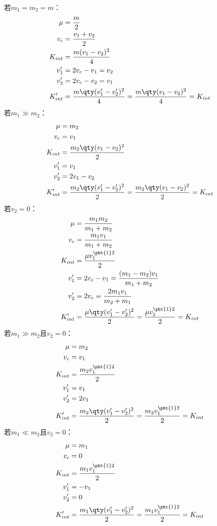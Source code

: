 \documentclass[a4paper,12pt]{article}
\begin{document}
若$m_1=m_2=m$：
\[\begin{aligned}
\mu&=\frac{m}{2}\\
v_c &= \frac{v_1+v_2}{2} \\
K_{int} &= \frac{m(v_1-v_2)^2}{4}\\
v_1' &= 2v_c - v_1 = v_2 \\
v_2' &= 2v_c - v_2 = v_1 \\
K_{int}' &= \frac{m\qty(v_1'-v_2')^2}{4} = \frac{m\qty(v_1-v_2)^2}{4} = K_{int}
\end{aligned}\]
若$m_1\gg m_2$：
\[\begin{aligned}
\mu&=m_2\\
v_c &= v_1 \\
K_{int} &= \frac{m_2\qty(v_1-v_2)^2}{2}\\
v_1' &= v_1 \\
v_2' &= 2v_1 - v_2 \\
K_{int}' &= \frac{m_2\qty(v_1'-v_2')^2}{2} = \frac{m_2\qty(v_1-v_2)^2}{2} = K_{int}
\end{aligned}\]
若$v_2=0$：
\[\begin{aligned}
\mu&=\frac{m_1m_2}{m_1+m_2}\\
v_c &= \frac{m_1v_1}{m_1+m_2} \\
K_{int} &= \frac{\mu v_1^{\pht{1}2}}{2}\\
v_1' &= 2v_c - v_1 = \frac{(m_1-m_2)v_1}{m_1+m_2} \\
v_2' &= 2v_c = \frac{2m_1v_1}{m_2+m_1} \\
K_{int}' &= \frac{\mu \qty(v_1'-v_2')^2}{2} = \frac{\mu v_1^{\pht{1}2}}{2} = K_{int}
\end{aligned}\]
若$m_1\gg m_2$且$v_2=0$：
\[\begin{aligned}
\mu&=m_2\\
v_c &= v_1 \\
K_{int} &= \frac{m_2v_1^{\pht{1}2}}{2}\\
v_1' &= v_1 \\
v_2' &= 2v_1 \\
K_{int}' &= \frac{m_2 \qty(v_1'-v_2')^2}{2} = \frac{m_2v_1^{\pht{1}2}}{2} = K_{int}
\end{aligned}\]
若$m_1\ll m_2$且$v_2=0$：
\[\begin{aligned}
\mu&=m_1\\
v_c &= 0 \\
K_{int} &= \frac{m_1v_1^{\pht{1}2}}{2}\\
v_1' &= -v_1 \\
v_2' &= 0 \\
K_{int}' &= \frac{m_1\qty(v_1'-v_2')^2}{2} = \frac{m_1v_1^{\pht{1}2}}{2} = K_{int}
\end{aligned}\]
\end{document}

